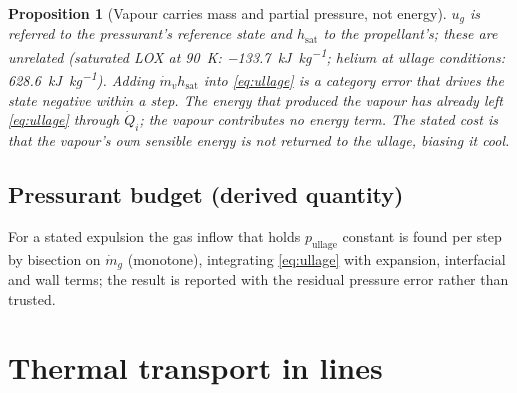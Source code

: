 \documentclass[11pt,a4paper]{article}
\newtheorem{proposition}{Proposition}
\newcommand{\mdot}{\dot{m}}
\newcommand{\Qdot}{\dot{Q}}
\begin{document}
\begin{proposition}[Vapour carries mass and partial pressure, not energy]\label{prop:reference}
$u_g$ is referred to the pressurant's reference state and $h_{\mathrm{sat}}$
to the propellant's; these are unrelated (saturated LOX at \SI{90}{\kelvin}:
\SI{-133.7}{\kilo\joule\per\kilogram}; helium at ullage conditions:
\SI{+628.6}{\kilo\joule\per\kilogram}). Adding $\mdot_vh_{\mathrm{sat}}$ into
\cref{eq:ullage} is a category error that drives the state negative within a
step. The energy that produced the vapour has already left \cref{eq:ullage}
through $\Qdot_i$; the vapour contributes no energy term. The stated cost is
that the vapour's own sensible energy is not returned to the ullage, biasing it
cool.
\end{proposition}

\subsection{Pressurant budget (derived quantity)}
For a stated expulsion the gas inflow that holds $p_{\mathrm{ullage}}$ constant
is found per step by bisection on $\mdot_g$ (monotone), integrating
\cref{eq:ullage} with expansion, interfacial and wall terms; the result is
reported with the residual pressure error rather than trusted.

\section{Thermal transport in lines}\label{sec:thermal}
\end{document}
